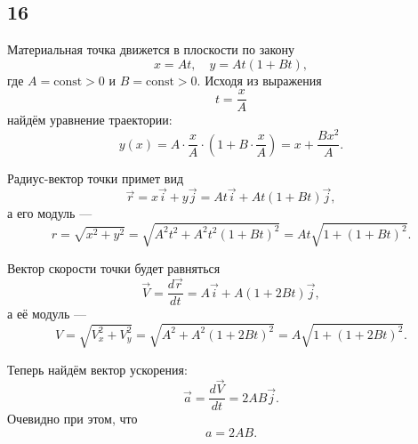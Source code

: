 \subsection{16}

Материальная точка движется в плоскости по закону
\[
x=At,\quad y=At(1+Bt),
\]
где $A=\text{const}>0$ и $B=\text{const}>0$. Исходя из выражения
\[
t=\frac{x}{A}
\]
найдём уравнение траектории:
\[
y(x)=A\cdot\frac{x}{A}\cdot\left(1+B\cdot\frac{x}{A}\right)=x+\frac{Bx^2}{A}.
\]

Радиус-вектор точки примет вид
\[
\vec r=x\vec i+y\vec j=At\vec i+At(1+Bt)\vec j,
\]
а его модуль ---
\[
r=\sqrt{x^2+y^2}=\sqrt{A^2t^2+A^2t^2(1+Bt)^2}=At\sqrt{1+(1+Bt)^2}.
\]

Вектор скорости точки будет равняться
\[
\vec V=\frac{d\vec r}{dt}=A\vec i+A(1+2Bt)\vec j,
\]
а её модуль ---
\[
V=\sqrt{V_x^2+V_y^2}=\sqrt{A^2+A^2(1+2Bt)^2}=A\sqrt{1+(1+2Bt)^2}.
\]

Теперь найдём вектор ускорения:
\[
\vec a=\frac{d\vec V}{dt}=2AB\vec j.
\]
Очевидно при этом, что
\[
a=2AB.
\]